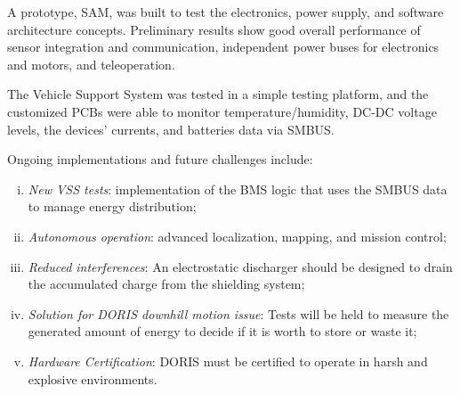 \documentclass{ifacconf}
\begin{document}

A prototype, SAM, was built to test the electronics, power supply, and software
architecture concepts.
Preliminary results show good overall performance of sensor integration and
communication, independent power buses for electronics and motors, and
teleoperation.

The Vehicle Support System was tested in a simple testing platform, and the
customized PCBs were able to monitor temperature/humidity, DC-DC
voltage levels, the devices' currents, and batteries data via SMBUS.

Ongoing implementations and future challenges include:
\begin{enumerate}[i)]
 
  \item \emph{New VSS tests}:
  implementation of the BMS logic that uses the SMBUS data to manage energy distribution;
  \item \emph{Autonomous operation}: advanced localization, mapping, and
  mission control;
  \item \emph{Reduced interferences}:
  An electrostatic discharger should be designed to drain the accumulated
  charge from the shielding system;
  \item \emph{Solution for DORIS downhill motion issue}: Tests will be held to measure the generated amount of energy to decide
  if it is worth to store or waste it;
  \item \emph{Hardware Certification}: 
  DORIS must be certified to operate in harsh and explosive environments.
\end{enumerate}



\appendix
\end{document}
